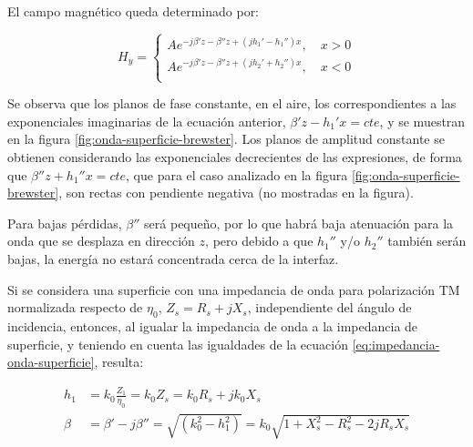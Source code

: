 El campo magnético queda determinado por:

\begin{equation}
	H_y =
	\left\lbrace
	\begin{aligned}
		A e^{-j\beta'z -\beta''z + (j h_1' - h_1'')x}, \quad x>0 \\
		A e^{-j\beta'z -\beta''z + (j h_2' + h_2'')x}, \quad x<0 \\
	\end{aligned}
	\right.
\end{equation}

Se observa que los planos de fase constante, en el aire, los correspondientes a las exponenciales imaginarias de la ecuación anterior, $\beta'z - h_1'x = cte$, y se muestran en la figura \ref{fig:onda-superficie-brewster}. Los planos de amplitud constante se obtienen considerando las exponenciales decrecientes de las expresiones, de forma que $\beta''z + h_1''x = cte$, que para el caso analizado en la figura \ref{fig:onda-superficie-brewster}, son rectas con pendiente negativa (no mostradas en la figura).

Para bajas pérdidas, $\beta''$ será pequeño, por lo que habrá baja atenuación para la onda que se desplaza en dirección $z$, pero debido a que $h_1''$ y/o $h_2''$ también serán bajas, la energía no estará concentrada cerca de la interfaz.



Si se considera una superficie con una impedancia de onda para polarización TM normalizada respecto de $\eta_0$, $Z_s = R_s + j X_s$, independiente del ángulo de incidencia, entonces, al igualar la impedancia de onda a la impedancia de superficie, y teniendo en cuenta las igualdades de la ecuación \ref{eq:impedancia-onda-superficie}, resulta:

\begin{align}
	h_1 & = k_0 \frac{Z_1}{\eta_0} = k_0 Z_s = k_0 R_s + j k_0 X_s \label{eq:h1-onda-superficie}\\
	\beta &= \beta' - j\beta'' =\sqrt{(k_0^2 - h_1^2)} = k_0 \sqrt{1+X_s^2 - R_s^2 - 2jR_s X_s} \label{eq:beta-onda-superficie}
\end{align}


